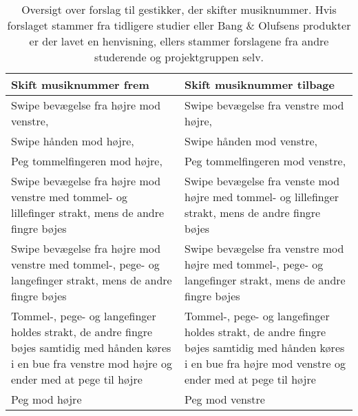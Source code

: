 \begin{table}[H]
	\centering
	\begin{tabular}{| p{6cm} | p{6cm} |}
		\hline
		\textbf{Skift musiknummer frem} & \textbf{Skift musiknummer tilbage} \\ \hline
		Swipe bevægelse fra højre mod venstre, \parencite[s. 48]{WEB:Beosound2, WEB:BeosoundMoment, PDF:UserDefinedGesturesTV} & Swipe bevægelse fra venstre mod højre, \parencite[s. 48]{WEB:Beosound2, WEB:BeosoundMoment, PDF:UserDefinedGesturesTV} \\ \hline
		Swipe hånden mod højre, \parencite[s. 166]{PDF:ComparingInputModalities}  & Swipe hånden mod venstre, \parencite[s. 166]{PDF:ComparingInputModalities}  \\ \hline
		Peg tommelfingeren mod højre, \parencite[s. 166]{PDF:ComparingInputModalities} & Peg tommelfingeren mod venstre, \parencite[s. 166]{PDF:ComparingInputModalities} \\ \hline
		Swipe bevægelse fra højre mod venstre med tommel- og lillefinger strakt, mens de andre fingre bøjes & Swipe bevægelse fra venste mod højre med tommel- og lillefinger strakt, mens de andre fingre bøjes \\ \hline
		Swipe bevægelse fra højre mod venstre med tommel-, pege- og langefinger strakt, mens de andre fingre bøjes & Swipe bevægelse fra venstre mod højre med tommel-, pege- og langefinger strakt, mens de andre fingre bøjes \\ \hline
		Tommel-, pege- og langefinger holdes strakt, de andre fingre bøjes samtidig med hånden køres i en bue fra venstre mod højre og ender med at pege til højre & Tommel-, pege- og langefinger holdes strakt, de andre fingre bøjes samtidig med hånden køres i en bue fra højre mod venstre og ender med at pege til højre\\ \hline
		Peg mod højre & Peg mod venstre\\ \hline
		
	\end{tabular}
	\caption{Oversigt over forslag til gestikker, der skifter musiknummer. Hvis forslaget stammer fra tidligere studier eller Bang $\&$ Olufsens produkter er der lavet en henvisning, ellers stammer forslagene fra andre studerende og projektgruppen selv.}
	\label{tab:IndsamledeGestikkerSkift}
\end{table}
\noindent

